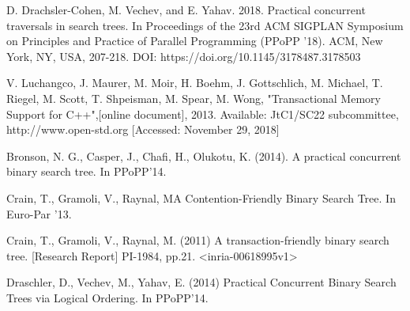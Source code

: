 \documentclass[conference]{IEEEtran}
\theoremstyle{definition}
\theoremstyle{theorem}
\begin{document}
\begin{thebibliography}{00}
 D. Drachsler-Cohen, M. Vechev, and E. Yahav. 2018. Practical concurrent traversals in search trees. In Proceedings of the 23rd ACM SIGPLAN Symposium on Principles and Practice of Parallel Programming (PPoPP '18). ACM, New York, NY, USA, 207-218. DOI: https://doi.org/10.1145/3178487.3178503


 V. Luchangco, J. Maurer, M. Moir, H. Boehm, J. Gottschlich, M. Michael, T. Riegel, M. Scott, T. Shpeisman, M. Spear, M. Wong, "Transactional Memory Support for C++",[online document], 2013. Available: JtC1/SC22 subcommittee, http://www.open-std.org [Accessed: November 29, 2018]

Bronson, N. G., Casper, J., Chafi, H., Olukotu, K. (2014). A practical concurrent binary search tree. In PPoPP'14.

Crain, T., Gramoli, V., Raynal, MA Contention-Friendly Binary Search Tree. In Euro-Par '13.

Crain, T., Gramoli, V., Raynal, M. (2011) A transaction-friendly binary search tree.  [Research Report] PI-1984, pp.21. <inria-00618995v1>

Draschler, D., Vechev, M., Yahav, E. (2014) Practical Concurrent Binary Search Trees via Logical Ordering. In PPoPP'14.
\end{thebibliography}
\end{document}
